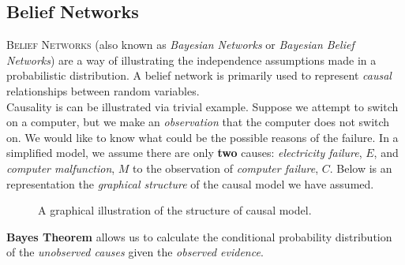 \subsection{Belief Networks}

\textsc{Belief Networks} (also known as \emph{Bayesian Networks} or \emph{Bayesian Belief Networks}) are a way of illustrating the independence assumptions made in a probabilistic distribution. A belief network is primarily used to represent \emph{causal} relationships between random variables.\\

Causality is can be illustrated via trivial example\cite{cowell}. Suppose we attempt to switch on a computer, but we make an \emph{observation} that the computer does not switch on. We would like to know what could be the possible reasons of the failure. In a simplified model, we assume there are only \textbf{two} causes: \emph{electricity failure}, $E$, and \emph{computer malfunction}, $M$ to the observation of \emph{computer failure}, $C$. Below is an representation the \emph{graphical structure} of the causal model we have assumed.

\begin{figure}
\centering
{}
\caption{A graphical illustration of the structure of causal model.}
\end{figure}

\textbf{Bayes Theorem} allows us to calculate the conditional probability distribution of the \emph{unobserved causes} given the \emph{observed evidence}. \\

